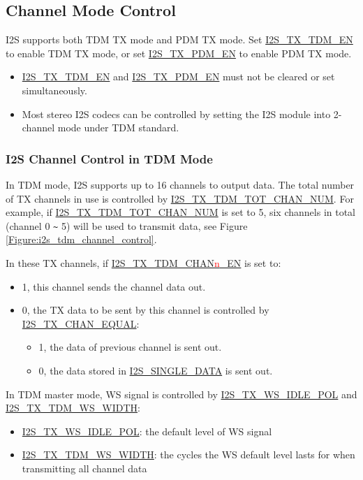 \documentclass[main\_\_CN.tex]{subfiles}
\begin{document}
\subsection{Channel Mode Control}
\chipname{} I2S supports both TDM TX mode and PDM TX mode. Set  \hyperref[fielddesc:I2STXTDMEN]{I2S\_TX\_TDM\_EN} to enable TDM TX mode, or set  \hyperref[fielddesc:I2STXPDMEN]{I2S\_TX\_PDM\_EN} to enable PDM TX mode.

\begin{tiplisting}
\vspace{-2em}
\begin{itemize}
    \item \hyperref[fielddesc:I2STXTDMEN]{I2S\_TX\_TDM\_EN} and \hyperref[fielddesc:I2STXPDMEN]{I2S\_TX\_PDM\_EN} must not be cleared or set simultaneously.
    \item Most stereo I2S codecs can be controlled by setting the I2S module into 2-channel mode under TDM standard.
    \end{itemize}
\end{tiplisting}

\subsubsection{I2S Channel Control in TDM Mode} \label{sec:tdm-channel-mode}
In TDM mode, I2S supports up to 16 channels to output data. The total number of TX channels in use is controlled by  \hyperref[fielddesc:I2STXTDMTOTCHANNUM]{I2S\_TX\_TDM\_TOT\_CHAN\_NUM}. For example, if  \hyperref[fielddesc:I2STXTDMTOTCHANNUM]{I2S\_TX\_TDM\_TOT\_CHAN\_NUM} is set to 5, six channels in total (channel 0 \verb+~+ 5) will be used to transmit data, see Figure
\ref{Figure:i2s_tdm_channel_control}.

In these TX channels, if  \hyperref[fielddesc:I2STXTDMCHAN0EN]{I2S\_TX\_TDM\_CHAN{\textcolor{red}{n}}\_EN} is set to:
\begin{itemize}
    \item 1, this channel sends the channel data out.
    \item 0, the TX data to be sent by this channel is controlled by  \hyperref[fielddesc:I2STXCHANEQUAL]{I2S\_TX\_CHAN\_EQUAL}:
    \begin{itemize}
        \item 1, the data of previous channel is sent out.
        \item 0, the data stored in  \hyperref[fielddesc:I2SSINGLEDATA]{I2S\_SINGLE\_DATA} is sent out.
    \end{itemize}
\end{itemize}
In TDM master mode, WS signal is controlled by \hyperref[fielddesc:I2STXWSIDLEPOL]{I2S\_TX\_WS\_IDLE\_POL} and  \hyperref[fielddesc:I2STXTDMWSWIDTH]{I2S\_TX\_TDM\_WS\_WIDTH}: \begin{itemize}
\item \hyperref[fielddesc:I2STXWSIDLEPOL]{I2S\_TX\_WS\_IDLE\_POL}: the default level of WS signal
\item \hyperref[fielddesc:I2STXTDMWSWIDTH]{I2S\_TX\_TDM\_WS\_WIDTH}: the cycles the WS default level lasts for when transmitting all channel data  \end{itemize}
\end{document}
